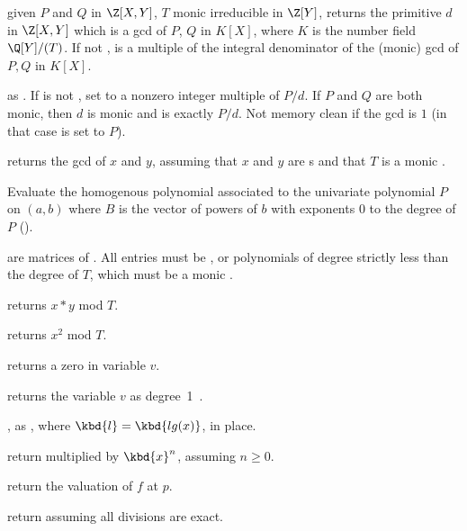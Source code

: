  given $P$ and $Q$ in
$\Z[X,Y]$, $T$ monic irreducible in $\Z[Y]$, returns the primitive $d$ in
$\Z[X,Y]$ which is a gcd of $P$, $Q$ in $K[X]$, where $K$ is the number field
$\Q[Y]/(T)$. If not ,  is a multiple of the integral
denominator of the (monic) gcd of $P,Q$ in $K[X]$.

 as .
If  is not , set  to a nonzero integer
multiple of $P/d$. If $P$ and $Q$ are both monic, then $d$ is monic and
 is exactly $P/d$. Not memory clean if the gcd is $1$
(in that case  is set to $P$).

 returns the gcd of $x$ and $y$,
assuming that $x$ and $y$ are s and that $T$ is a monic .

Evaluate the homogenous polynomial associated to the univariate polynomial
$P$ on $(a,b)$ where $B$ is the vector of powers of $b$ with exponents
$0$ to the degree of $P$ ().


 are matrices of . All entries must be ,  or
polynomials of degree strictly less than the degree of $T$, which must be a monic
.

 returns $x*y$ mod $T$.

 returns $x^2$ mod $T$.


 returns a zero  in variable $v$.

 returns the variable $v$ as degree~1~.

, as , where
$\kbd{l} = \kbd{lg(x)}$, in place.

 return 
multiplied by $\kbd{x}^n$, assuming $n\geq 0$.

 return the valuation of $f$ at $p$.

 return  assuming all divisions
are exact.


